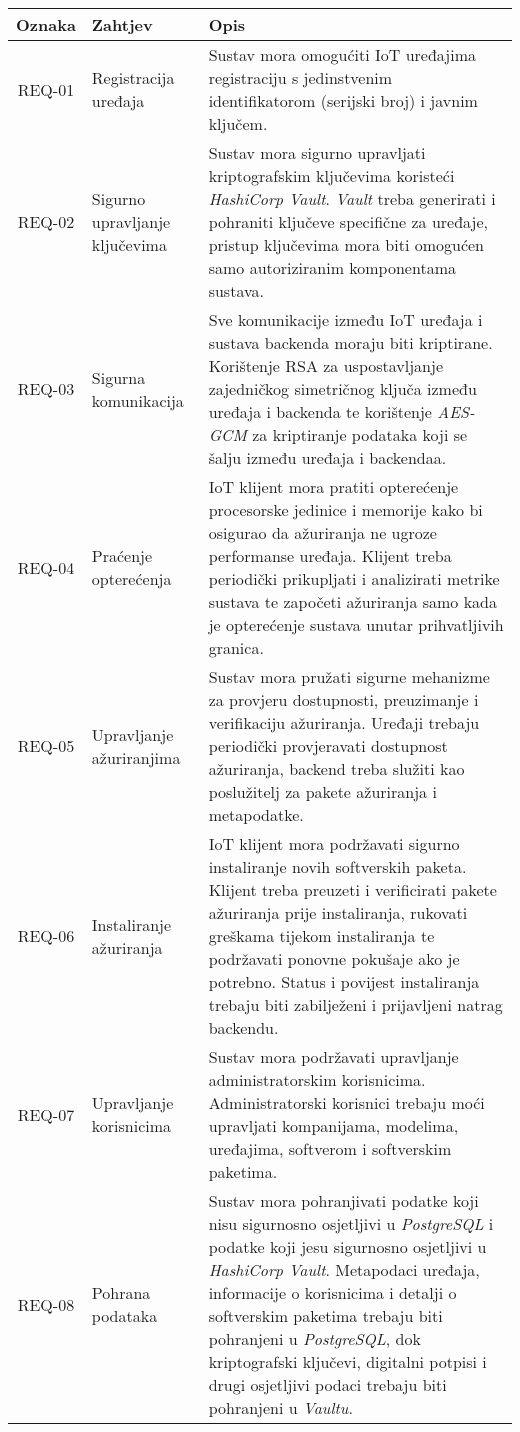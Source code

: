 \documentclass[zavrsnirad]{fer}
\begin{document}
	\footnotesize
	\begin{longtable}{|c|p{4cm}|p{8cm}|}
		\hline
		\textbf{Oznaka} & \textbf{Zahtjev} & \textbf{Opis} \\
		\hline
		REQ-01 & Registracija uređaja & Sustav mora omogućiti IoT uređajima registraciju s jedinstvenim identifikatorom (serijski broj) i javnim ključem.  \\
		\hline
		REQ-02 & Sigurno upravljanje ključevima & Sustav mora sigurno upravljati kriptografskim ključevima koristeći \textit{HashiCorp Vault}. \textit{Vault} treba generirati i pohraniti ključeve specifične za uređaje, pristup ključevima mora biti omogućen samo autoriziranim komponentama sustava. \\
		\hline
		REQ-03 & Sigurna komunikacija & Sve komunikacije između IoT uređaja i sustava backenda moraju biti kriptirane. Korištenje RSA za uspostavljanje zajedničkog simetričnog ključa između uređaja i backenda te korištenje \textit{AES-GCM} za kriptiranje podataka koji se šalju između uređaja i backendaa. \\
		\hline
		REQ-04 & Praćenje opterećenja & IoT klijent mora pratiti opterećenje procesorske jedinice i memorije kako bi osigurao da ažuriranja ne ugroze performanse uređaja. Klijent treba periodički prikupljati i analizirati metrike sustava te započeti ažuriranja samo kada je opterećenje sustava unutar prihvatljivih granica. \\
		\hline
		REQ-05 & Upravljanje ažuriranjima & Sustav mora pružati sigurne mehanizme za provjeru dostupnosti, preuzimanje i verifikaciju ažuriranja. Uređaji trebaju periodički provjeravati dostupnost ažuriranja, backend treba služiti kao poslužitelj za pakete ažuriranja i metapodatke. \\
		\hline
		REQ-06 & Instaliranje ažuriranja & IoT klijent mora podržavati sigurno instaliranje novih softverskih paketa. Klijent treba preuzeti i verificirati pakete ažuriranja prije instaliranja, rukovati greškama tijekom instaliranja te podržavati ponovne pokušaje ako je potrebno. Status i povijest instaliranja trebaju biti zabilježeni i prijavljeni natrag backendu. \\
		\hline
		REQ-07 & Upravljanje korisnicima & Sustav mora podržavati upravljanje administratorskim korisnicima. Administratorski korisnici trebaju moći upravljati kompanijama, modelima, uređajima, softverom i softverskim paketima. \\
		\hline
		REQ-08 & Pohrana podataka & Sustav mora pohranjivati podatke koji nisu sigurnosno osjetljivi u \textit{PostgreSQL} i podatke koji jesu sigurnosno osjetljivi u \textit{HashiCorp Vault}. Metapodaci uređaja, informacije o korisnicima i detalji o softverskim paketima trebaju biti pohranjeni u \textit{PostgreSQL}, dok kriptografski ključevi, digitalni potpisi i drugi osjetljivi podaci trebaju biti pohranjeni u \textit{Vaultu}. \\

\end{longtable}
\end{document}
